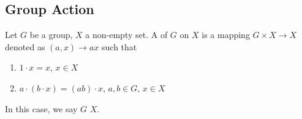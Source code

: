 
\subsection{Group Action}%
\label{sub:group_action}

\begin{defn}
\label{defn:group_action}
  Let $G$ be a group, $X$ a non-empty set. A  of $G$ on $X$ is a mapping $G \times X \to X$ denoted as $(a, x) \to ax$ such that
  \begin{enumerate}
    \item $1 \cdot x = x$, $x \in X$
    \item $a \cdot (b \cdot x) = (ab) \cdot x$, $a, b \in G, \, x \in X$
  \end{enumerate}
  In this case, we say $G$  $X$.
\end{defn}



